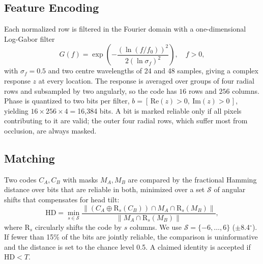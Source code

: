\documentclass[conference]{IEEEtran}
\begin{document}
\subsection{Feature Encoding}
Each normalized row is filtered in the Fourier domain with a one-dimensional Log-Gabor filter
\begin{equation}
G(f)=\exp\!\left(-\frac{\left(\ln (f/f_0)\right)^2}{2\left(\ln \sigma_f\right)^2}\right),\quad f>0,
\label{eq:loggabor}
\end{equation}
with $\sigma_f=0.5$ and two centre wavelengths of 24 and 48 samples, giving a complex response $z$ at every location. The response is averaged over groups of four radial rows and subsampled by two angularly, so the code has $16$ rows and $256$ columns. Phase is quantized to two bits per filter, $b=[\,\mathrm{Re}(z)>0,\ \mathrm{Im}(z)>0\,]$, yielding $16\times256\times4=$16{,}384 bits. A bit is marked reliable only if all pixels contributing to it are valid; the outer four radial rows, which suffer most from occlusion, are always masked.

\subsection{Matching}
Two codes $C_A, C_B$ with masks $M_A, M_B$ are compared by the fractional Hamming distance over bits that are reliable in both, minimized over a set $\mathcal{S}$ of angular shifts that compensates for head tilt:
\begin{equation}
\mathrm{HD}=\min_{s\in\mathcal{S}}\frac{\left\|\left(C_A\oplus \mathrm{R}_s(C_B)\right)\cap M_A\cap \mathrm{R}_s(M_B)\right\|}{\left\|M_A\cap \mathrm{R}_s(M_B)\right\|},
\label{eq:hd}
\end{equation}
where $\mathrm{R}_s$ circularly shifts the code by $s$ columns. We use $\mathcal{S}=\{-6,\dots,6\}$ ($\pm$8.4$^\circ$). If fewer than 15\% of the bits are jointly reliable, the comparison is uninformative and the distance is set to the chance level 0.5. A claimed identity is accepted if $\mathrm{HD}<T$.
\end{document}
